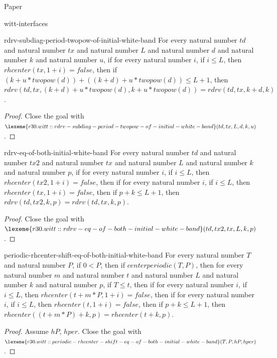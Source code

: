 \begin{lexlean}{Paper}
\begin{section}{witt-interfaces}
  \begin{theorem}{rdrv-subdiag-period-twopow-of-initial-white-band}
  For every natural number \(td\) and natural number \(tx\) and natural number \(L\) and natural number \(d\) and natural number \(k\) and natural number \(u\), if for every natural number \(i\), if \(i ≤ L\), then \(rhcenter(tx, 1 + i) = false\), then if \((k + u * twopow(d)) + ((k + d) + u * twopow(d)) ≤ L + 1\), then \(rdrv(td, tx, (k + d) + u * twopow(d), k + u * twopow(d)) = rdrv(td, tx, k + d, k)\).
  \begin{proof}
  Close the goal with \(\lexeme{r30.witt::rdrv-subdiag-period-twopow-of-initial-white-band}(td, tx, L, d, k, u)\).
  \end{proof}
  \end{theorem}

  \begin{theorem}{rdrv-eq-of-both-initial-white-band}
  For every natural number \(td\) and natural number \(tx2\) and natural number \(tx\) and natural number \(L\) and natural number \(k\) and natural number \(p\), if for every natural number \(i\), if \(i ≤ L\), then \(rhcenter(tx2, 1 + i) = false\), then if for every natural number \(i\), if \(i ≤ L\), then \(rhcenter(tx, 1 + i) = false\), then if \(p + k ≤ L + 1\), then \(rdrv(td, tx2, k, p) = rdrv(td, tx, k, p)\).
  \begin{proof}
  Close the goal with \(\lexeme{r30.witt::rdrv-eq-of-both-initial-white-band}(td, tx2, tx, L, k, p)\).
  \end{proof}
  \end{theorem}

  \begin{theorem}{periodic-rhcenter-shift-eq-of-both-initial-white-band}
  For every natural number \(T\) and natural number \(P\), if \(0 < P\), then if \(centerperiodic(T, P)\), then for every natural number \(m\) and natural number \(t\) and natural number \(L\) and natural number \(k\) and natural number \(p\), if \(T ≤ t\), then if for every natural number \(i\), if \(i ≤ L\), then \(rhcenter(t + m * P, 1 + i) = false\), then if for every natural number \(i\), if \(i ≤ L\), then \(rhcenter(t, 1 + i) = false\), then if \(p + k ≤ L + 1\), then \(rhcenter((t + m * P) + k, p) = rhcenter(t + k, p)\).
  \begin{proof}
  Assume \(hP\), \(hper\).
  Close the goal with \(\lexeme{r30.witt::periodic-rhcenter-shift-eq-of-both-initial-white-band}(T, P, hP, hper)\).
  \end{proof}
  \end{theorem}


\end{section}
\end{lexlean}
